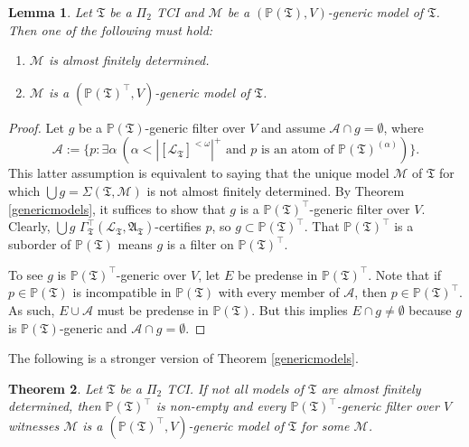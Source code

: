 \documentclass[12pt, twoside]{memoir}
\numberwithin{equation}{section}
\newtheorem{thm}{Theorem}[section]
\newtheorem{lem}[thm]{Lemma}
\theoremstyle{definition}
\theoremstyle{remark}
\theoremstyle{definition}
\theoremstyle{definition}
\theoremstyle{definition}
\theoremstyle{remark}
\begin{document}
\begin{lem}
Let $\mathfrak{T}$ be a $\Pi_2$ TCI and $\mathcal{M}$ be a $(\mathbb{P}(\mathfrak{T}), V)$-generic model of $\mathfrak{T}$. Then one of the following must hold:
\begin{enumerate}[label=(\arabic*)]
    \item $\mathcal{M}$ is almost finitely determined.
    \item $\mathcal{M}$ is a $(\mathbb{P}(\mathfrak{T})^{\top}, V)$-generic model of $\mathfrak{T}$.
\end{enumerate}
\end{lem}

\begin{proof}
Let $g$ be a $\mathbb{P}(\mathfrak{T})$-generic filter over $V$ and assume $\mathcal{A} \cap g = \emptyset$, where $$\mathcal{A} := \{p : \exists \alpha \ (\alpha < |[\mathcal{L}_{\mathfrak{T}}]^{< \omega}|^+ \text{ and } p \text{ is an atom of } \mathbb{P}(\mathfrak{T})^{(\alpha)})\}.$$ This latter assumption is equivalent to saying that the unique model $\mathcal{M}$ of $\mathfrak{T}$ for which $\bigcup g = \Sigma(\mathfrak{T}, \mathcal{M})$ is not almost finitely determined. By Theorem \ref{genericmodels}, it suffices to show that $g$ is a $\mathbb{P}(\mathfrak{T})^{\top}$-generic filter over $V$. Clearly, $\bigcup g$ $\Gamma_{\mathfrak{T}}^{\top} (\mathcal{L}_{\mathfrak{T}}, \mathfrak{A}_{\mathfrak{T}})$-certifies $p$, so $g \subset \mathbb{P}(\mathfrak{T})^{\top}$. That $\mathbb{P}(\mathfrak{T})^{\top}$ is a suborder of $\mathbb{P}(\mathfrak{T})$ means $g$ is a filter on $\mathbb{P}(\mathfrak{T})^{\top}$.

To see $g$ is $\mathbb{P}(\mathfrak{T})^{\top}$-generic over $V$, let $E$ be predense in $\mathbb{P}(\mathfrak{T})^{\top}$. Note that if $p \in \mathbb{P}(\mathfrak{T})$ is incompatible in $\mathbb{P}(\mathfrak{T})$ with every member of $\mathcal{A}$, then $p \in \mathbb{P}(\mathfrak{T})^{\top}$. As such, $E \cup \mathcal{A}$ must be predense in $\mathbb{P}(\mathfrak{T})$. But this implies $E \cap g \neq \emptyset$ because $g$ is $\mathbb{P}(\mathfrak{T})$-generic and $\mathcal{A} \cap g = \emptyset$.
\end{proof}

The following is a stronger version of Theorem \ref{genericmodels}.

\begin{thm}\label{genericdichom}
Let $\mathfrak{T}$ be a $\Pi_2$ TCI. If not all models of $\mathfrak{T}$ are almost finitely determined, then $\mathbb{P}(\mathfrak{T})^{\top}$ is non-empty and every $\mathbb{P}(\mathfrak{T})^{\top}$-generic filter over $V$ witnesses $\mathcal{M}$ is a $(\mathbb{P}(\mathfrak{T})^{\top}, V)$-generic model of $\mathfrak{T}$ for some $\mathcal{M}$.
\end{thm}
\end{document}
